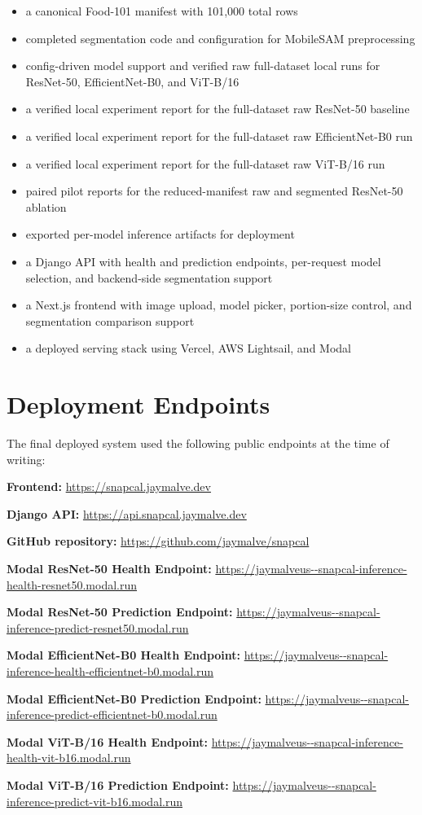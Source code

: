 \documentclass[sigconf,nonacm,11pt]{acmart}
\begin{document}
\begin{itemize}
\item a canonical Food-101 manifest with 101,000 total rows
\item completed segmentation code and configuration for MobileSAM preprocessing
\item config-driven model support and verified raw full-dataset local runs for ResNet-50, EfficientNet-B0, and ViT-B/16
\item a verified local experiment report for the full-dataset raw ResNet-50 baseline
\item a verified local experiment report for the full-dataset raw EfficientNet-B0 run
\item a verified local experiment report for the full-dataset raw ViT-B/16 run
\item paired pilot reports for the reduced-manifest raw and segmented ResNet-50 ablation
\item exported per-model inference artifacts for deployment
\item a Django API with health and prediction endpoints, per-request model selection, and backend-side segmentation support
\item a Next.js frontend with image upload, model picker, portion-size control, and segmentation comparison support
\item a deployed serving stack using Vercel, AWS Lightsail, and Modal
\end{itemize}

\section{Deployment Endpoints}
The final deployed system used the following public endpoints at the time of writing:

\noindent \textbf{Frontend:} \url{https://snapcal.jaymalve.dev}

\noindent \textbf{Django API:} \url{https://api.snapcal.jaymalve.dev}

\noindent \textbf{GitHub repository:} \url{https://github.com/jaymalve/snapcal}

\noindent \textbf{Modal ResNet-50 Health Endpoint:} \url{https://jaymalveus--snapcal-inference-health-resnet50.modal.run}

\noindent \textbf{Modal ResNet-50 Prediction Endpoint:} \url{https://jaymalveus--snapcal-inference-predict-resnet50.modal.run}

\noindent \textbf{Modal EfficientNet-B0 Health Endpoint:} \url{https://jaymalveus--snapcal-inference-health-efficientnet-b0.modal.run}

\noindent \textbf{Modal EfficientNet-B0 Prediction Endpoint:} \url{https://jaymalveus--snapcal-inference-predict-efficientnet-b0.modal.run}

\noindent \textbf{Modal ViT-B/16 Health Endpoint:} \url{https://jaymalveus--snapcal-inference-health-vit-b16.modal.run}

\noindent \textbf{Modal ViT-B/16 Prediction Endpoint:} \url{https://jaymalveus--snapcal-inference-predict-vit-b16.modal.run}
\end{document}
